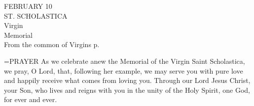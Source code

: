 \begin{center}\normalsize FEBRUARY 10\\
\footnotesize ST. SCHOLASTICA\\
\footnotesize Virgin\\
\footnotesize Memorial\\
\footnotesize From the common of Virgins p. \\
\end{center}

\hangindent=\parindent \small{PRAYER 
As we celebrate anew the Memorial of the Virgin Saint Scholastica,
we pray, O Lord,
that, following her example,
we may serve you with pure love
and happily receive what comes from loving you.
Through our Lord Jesus Christ, your Son,
who lives and reigns with you in the unity of the Holy Spirit,
one God, for ever and ever.\\}
 
